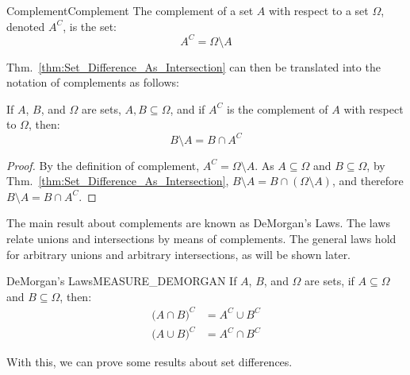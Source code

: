         \begin{ldefinition}{Complement}{Complement}
            The complement of a set $A$ with respect to a set
            $\Omega$, denoted $A^{C}$, is the set:
            \begin{equation}
                A^{C}=\Omega\setminus{A}
            \end{equation}
        \end{ldefinition}
        Thm.~\ref{thm:Set_Difference_As_Intersection}
        can then be translated into the notation of
        complements as follows:
        \begin{theorem}
            If $A$, $B$, and $\Omega$ are sets,
            $A,B\subseteq\Omega$, and if $A^{C}$ is the
            complement of $A$ with respect to $\Omega$, then:
            \begin{equation}
                B\setminus{A}=B\cap{A}^{C}
            \end{equation}
        \end{theorem}
        \begin{proof}
            By the definition of complement,
            $A^{C}=\Omega\setminus{A}$.
            As $A\subseteq\Omega$ and $B\subseteq\Omega$, by
            Thm.~\ref{thm:Set_Difference_As_Intersection},
            $B\setminus{A}=B\cap(\Omega\setminus{A})$,
            and therefore $B\setminus{A}=B\cap{A}^{C}$.
        \end{proof}
        The main result about complements are known as
        DeMorgan's Laws. The laws relate unions and
        intersections by means of complements. The general
        laws hold for arbitrary unions and arbitrary
        intersections, as will be shown later.
        \begin{ftheorem}{DeMorgan's Laws}{MEASURE_DEMORGAN}
            If $A$, $B$, and $\Omega$ are sets, if
            $A\subseteq\Omega$ and $B\subseteq\Omega$, then:
            \begin{subequations}
                \begin{align}
                    \big(A\cap{B}\big)^{C}
                    &=A^{C}\cup{B}^{C}\\
                    \big(A\cup{B}\big)^{C}
                    &=A^{C}\cap{B}^{C}
                \end{align}
            \end{subequations}
        \end{ftheorem}
        With this, we can prove some results about
        set differences.
